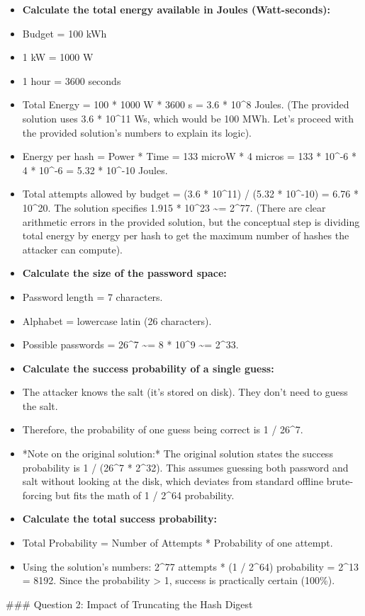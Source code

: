 \documentclass{article}
\begin{document}
\begin{itemize}
    \item[\textbf{1.}] \textbf{Calculate the total energy available in Joules (Watt-seconds):}
    \item Budget = 100 kWh
    \item 1 kW = 1000 W
    \item 1 hour = 3600 seconds
    \item Total Energy = 100 * 1000 W * 3600 s = 3.6 * 10\textasciicircum{}8 Joules. (The provided solution uses 3.6 * 10\textasciicircum{}11 Ws, which would be 100 MWh. Let's proceed with the provided solution's numbers to explain its logic).
    \item Energy per hash = Power * Time = 133 microW * 4 micros = 133 * 10\textasciicircum{}-6 * 4 * 10\textasciicircum{}-6 = 5.32 * 10\textasciicircum{}-10 Joules.
    \item Total attempts allowed by budget = (3.6 * 10\textasciicircum{}11) / (5.32 * 10\textasciicircum{}-10) = 6.76 * 10\textasciicircum{}20. The solution specifies 1.915 * 10\textasciicircum{}23 \textasciitilde{}= 2\textasciicircum{}77. (There are clear arithmetic errors in the provided solution, but the conceptual step is dividing total energy by energy per hash to get the maximum number of hashes the attacker can compute).

    \item[\textbf{2.}] \textbf{Calculate the size of the password space:}
    \item Password length = 7 characters.
    \item Alphabet = lowercase latin (26 characters).
    \item Possible passwords = 26\textasciicircum{}7 \textasciitilde{}= 8 * 10\textasciicircum{}9 \textasciitilde{}= 2\textasciicircum{}33.

    \item[\textbf{3.}] \textbf{Calculate the success probability of a single guess:}
    \item The attacker knows the salt (it's stored on disk). They don't need to guess the salt.
    \item Therefore, the probability of one guess being correct is 1 / 26\textasciicircum{}7.
    \item *Note on the original solution:* The original solution states the success probability is 1 / (26\textasciicircum{}7 * 2\textasciicircum{}32). This assumes guessing both password and salt without looking at the disk, which deviates from standard offline brute-forcing but fits the math of 1 / 2\textasciicircum{}64 probability.

    \item[\textbf{4.}] \textbf{Calculate the total success probability:}
    \item Total Probability = Number of Attempts * Probability of one attempt.
    \item Using the solution's numbers: 2\textasciicircum{}77 attempts * (1 / 2\textasciicircum{}64) probability = 2\textasciicircum{}13 = 8192. Since the probability > 1, success is practically certain (100\%).

\end{itemize}
\#\#\# Question 2: Impact of Truncating the Hash Digest
\end{document}
